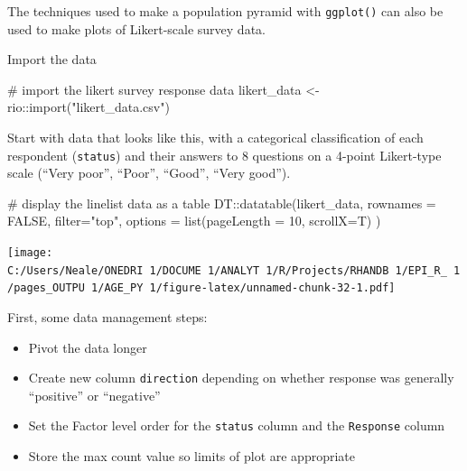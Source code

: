 \documentclass[
]{article}
\newenvironment{Shaded}{\begin{snugshade}}{\end{snugshade}}
\newcommand{\CommentTok}[1]{\textcolor[rgb]{0.50,0.62,0.50}{#1}}
\newcommand{\DataTypeTok}[1]{\textcolor[rgb]{0.87,0.87,0.75}{#1}}
\newcommand{\DecValTok}[1]{\textcolor[rgb]{0.86,0.86,0.80}{#1}}
\newcommand{\KeywordTok}[1]{\textcolor[rgb]{0.94,0.87,0.69}{#1}}
\newcommand{\NormalTok}[1]{\textcolor[rgb]{0.80,0.80,0.80}{#1}}
\newcommand{\OperatorTok}[1]{\textcolor[rgb]{0.94,0.94,0.82}{#1}}
\newcommand{\OtherTok}[1]{\textcolor[rgb]{0.94,0.94,0.56}{#1}}
\newcommand{\StringTok}[1]{\textcolor[rgb]{0.80,0.58,0.58}{#1}}
\providecommand{\tightlist}{%
  \setlength{\itemsep}{0pt}\setlength{\parskip}{0pt}}
\begin{document}
The techniques used to make a population pyramid with \texttt{ggplot()}
can also be used to make plots of Likert-scale survey data.

Import the data

\begin{Shaded}
\begin{Highlighting}[]
\CommentTok{\# import the likert survey response data}
\NormalTok{likert\_data \textless{}{-}}\StringTok{ }\NormalTok{rio}\OperatorTok{::}\KeywordTok{import}\NormalTok{(}\StringTok{"likert\_data.csv"}\NormalTok{)}
\end{Highlighting}
\end{Shaded}

Start with data that looks like this, with a categorical classification
of each respondent (\texttt{status}) and their answers to 8 questions on
a 4-point Likert-type scale (``Very poor'', ``Poor'', ``Good'', ``Very
good'').

\begin{Shaded}
\begin{Highlighting}[]
\CommentTok{\# display the linelist data as a table}
\NormalTok{DT}\OperatorTok{::}\KeywordTok{datatable}\NormalTok{(likert\_data, }\DataTypeTok{rownames =} \OtherTok{FALSE}\NormalTok{, }\DataTypeTok{filter=}\StringTok{"top"}\NormalTok{, }\DataTypeTok{options =} \KeywordTok{list}\NormalTok{(}\DataTypeTok{pageLength =} \DecValTok{10}\NormalTok{, }\DataTypeTok{scrollX=}\NormalTok{T) )}
\end{Highlighting}
\end{Shaded}

\texttt{[image: C:/Users/Neale/ONEDRI~1/DOCUME~1/ANALYT~1/R/Projects/RHANDB~1/EPI\_R\_~1/pages\_OUTPU~1/AGE\_PY~1/figure-latex/unnamed-chunk-32-1.pdf]}

First, some data management steps:

\begin{itemize}
\tightlist
\item
  Pivot the data longer\\
\item
  Create new column \texttt{direction} depending on whether response was
  generally ``positive'' or ``negative''\\
\item
  Set the Factor level order for the \texttt{status} column and the
  \texttt{Response} column\\
\item
  Store the max count value so limits of plot are appropriate
\end{itemize}
\end{document}
